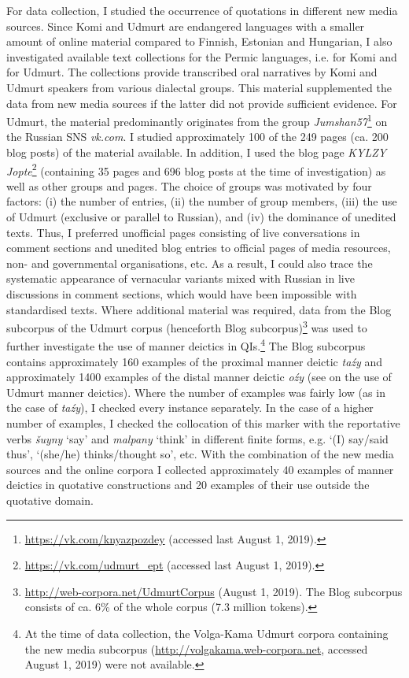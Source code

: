 \documentclass[output=paper,colorlinks,citecolor=brown]{langscibook}
\begin{document}
For data collection, I studied the occurrence of quotations in different new media sources. Since Komi and Udmurt are endangered languages with a smaller amount of online material compared to Finnish, Estonian and Hungarian, I also investigated available text collections for the Permic languages, i.e. \citet{Uotila1985,Uotila1989} for Komi and \citet{Kelmakov1981,Kelmakov1990} for Udmurt. The collections provide transcribed oral narratives by Komi and Udmurt speakers from various dialectal groups. This material supplemented the data from new media sources if the latter did not provide sufficient evidence. For Udmurt, the material predominantly originates from the group \textit{Jumshan57}\footnote{\url{https://vk.com/knyazpozdey} (accessed last August 1, 2019).} on the Russian SNS \textit{vk.com}. I studied approximately 100 of the 249 pages (ca. 200 blog posts) of the material available. In addition, I used the blog page \textit{KYLZY Jopte}\footnote{\url{https://vk.com/udmurt_ept} (accessed last August 1, 2019).} (containing 35 pages and 696 blog posts at the time of investigation) as well as other groups and pages. The choice of groups was motivated by four factors: (i) the number of entries, (ii) the number of group members, (iii) the use of Udmurt (exclusive or parallel to Russian), and (iv) the dominance of unedited texts. Thus, I preferred unofficial pages consisting of live conversations in comment sections and unedited blog entries to official pages of media resources, non- and governmental organisations, etc. As a result, I could also trace the systematic appearance of vernacular variants mixed with Russian in live discussions in comment sections, which would have been impossible with standardised texts. Where additional material was required, data from the Blog subcorpus of the Udmurt corpus (henceforth Blog subcorpus)\footnote{\url{http://web-corpora.net/UdmurtCorpus} (August 1, 2019). The Blog subcorpus consists of ca. 6\% of the whole corpus (7.3 million tokens).} was used to further investigate the use of manner deictics in QIs.\footnote{At the time of data collection, the Volga-Kama Udmurt corpora containing the new media subcorpus (\url{http://volgakama.web-corpora.net}, accessed August 1, 2019) were not available.} The Blog subcorpus contains approximately 160 examples of the proximal manner deictic \textit{taźy} and approximately 1400 examples of the distal manner deictic \textit{oźy} (see  on the use of Udmurt manner deictics). Where the number of examples was fairly low (as in the case of \textit{taźy}), I checked every instance separately. In the case of a higher number of examples, I checked the collocation of this marker with the reportative verbs \textit{šuyny} ‘say’ and \textit{malpany} ‘think’ in different finite forms, e.g. ‘(I) say/said thus’, ‘(she/he) thinks/thought so’, etc. With the combination of the new media sources and the online corpora I collected approximately 40 examples of manner deictics in quotative constructions and 20 examples of their use outside the quotative domain.
\end{document}
